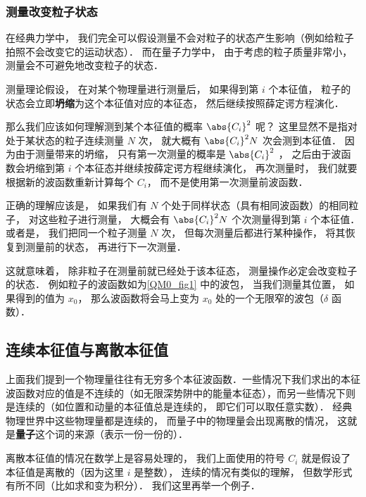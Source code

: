 \subsubsection{测量改变粒子状态}
在经典力学中， 我们完全可以假设测量不会对粒子的状态产生影响（例如给粒子拍照不会改变它的运动状态）． 而在量子力学中， 由于考虑的粒子质量非常小， 测量会不可避免地改变粒子的状态．

测量理论假设， 在对某个物理量进行测量后， 如果得到第 $i$ 个本征值， 粒子的状态会立即\textbf{坍缩}为这个本征值对应的本征态， 然后继续按照薛定谔方程演化．

那么我们应该如何理解测到某个本征值的概率 $\abs{C_i}^2$ 呢？ 这里显然不是指对处于某状态的粒子连续测量 $N$ 次， 就大概有 $\abs{C_i}^2 N$ 次会测到本征值． 因为由于测量带来的坍缩， 只有第一次测量的概率是 $\abs{C_i}^2$ ， 之后由于波函数会坍缩到第 $i$ 个本征态并继续按薛定谔方程继续演化， 再次测量时， 我们就要根据新的波函数重新计算每个 $C_i$， 而不是使用第一次测量前波函数．

正确的理解应该是， 如果我们有 $N$ 个处于同样状态（具有相同波函数）的相同粒子， 对这些粒子进行测量， 大概会有 $\abs{C_i}^2 N$ 个次测量得到第 $i$ 个本征值． 或者是， 我们把同一个粒子测量 $N$ 次， 但每次测量后都进行某种操作， 将其恢复到测量前的状态， 再进行下一次测量．

这就意味着， 除非粒子在测量前就已经处于该本征态， 测量操作必定会改变粒子的状态． 例如粒子的波函数如为\autoref{QM0_fig1} 中的波包， 当我们测量其位置， 如果得到的值为 $x_0$， 那么波函数将会马上变为 $x_0$ 处的一个无限窄的波包（$\delta$ 函数）．

\subsection{连续本征值与离散本征值}
上面我们提到一个物理量往往有无穷多个本征波函数．一些情况下我们求出的本征波函数对应的值是不连续的（如无限深势阱中的能量本征态），而另一些情况下则是连续的（如位置和动量的本征值总是连续的， 即它们可以取任意实数）． 经典物理世界中这些物理量都是连续的， 而量子中的物理量会出现离散的情况， 这就是\textbf{量子}这个词的来源（表示一份一份的）．

离散本征值的情况在数学上是容易处理的， 我们上面使用的符号 $C_i$ 就是假设了本征值是离散的（因为这里 $i$ 是整数）， 连续的情况有类似的理解， 但数学形式有所不同（比如求和变为积分）． 我们这里再举一个例子．

